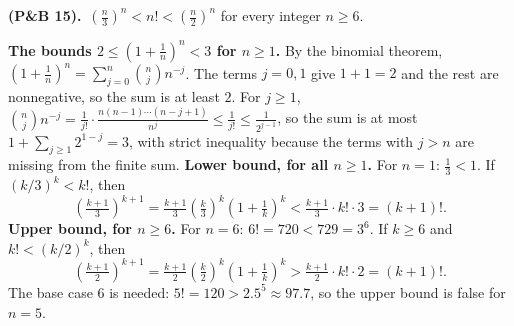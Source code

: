 \documentclass[10pt]{scrartcl}
\begin{document}
\begin{prob}\textbf{ (P\&B 15).}\ $\left(\frac n3\right)^n < n! < \left(\frac n2\right)^n$ for every integer $n \geq 6$.\par
{}
\begin{steps}
  \ii \textbf{The bounds $2 \leq (1 + \frac1n)^n < 3$ for $n \geq 1$.} By the binomial theorem, $(1+\frac1n)^n = \sum_{j=0}^{n} \binom nj n^{-j}$. The terms $j = 0, 1$ give $1 + 1 = 2$ and the rest are nonnegative, so the sum is at least $2$. For $j \geq 1$, $\binom nj n^{-j} = \frac{1}{j!}\cdot\frac{n(n-1)\cdots(n-j+1)}{n^j} \leq \frac{1}{j!} \leq \frac{1}{2^{j-1}}$, so the sum is at most $1 + \sum_{j \ge 1} 2^{1-j} = 3$, with strict inequality because the terms with $j > n$ are missing from the finite sum.
  \ii \textbf{Lower bound, for all $n \geq 1$.} For $n = 1$: $\frac13 < 1$. If $(k/3)^k < k!$, then
  \[ \left(\tfrac{k+1}{3}\right)^{k+1} = \tfrac{k+1}{3}\left(\tfrac k3\right)^k \left(1 + \tfrac1k\right)^k < \tfrac{k+1}{3} \cdot k! \cdot 3 = (k+1)!. \]
  \ii \textbf{Upper bound, for $n \geq 6$.} For $n = 6$: $6! = 720 < 729 = 3^6$. If $k \geq 6$ and $k! < (k/2)^k$, then
  \[ \left(\tfrac{k+1}{2}\right)^{k+1} = \tfrac{k+1}{2}\left(\tfrac k2\right)^k \left(1 + \tfrac1k\right)^k > \tfrac{k+1}{2} \cdot k! \cdot 2 = (k+1)!. \]
  \ii The base case $6$ is needed: $5! = 120 > 2.5^5 \approx 97.7$, so the upper bound is false for $n = 5$.
\end{steps}
\end{prob}
\end{document}
